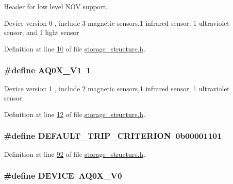 Header for low level N\+O\+V support. 

Device version 0 , include 3 magnetic sensors,1 infrared sensor, 1 ultraviolet sensor, and 1 light sensor 

Definition at line \hyperlink{a00003_source_l00010}{10} of file \hyperlink{a00003_source}{storage\+\_\+structure.\+h}.

\hypertarget{a00003_a4fe07f06b0aa99b609cb9f3d37b30932}{
\subsubsection[{A\+Q0\+X\+\_\+\+V1}]{\setlength{\rightskip}{0pt plus 5cm}\#define A\+Q0\+X\+\_\+\+V1~1}}\label{a00003_a4fe07f06b0aa99b609cb9f3d37b30932}


Device version 1 , include 2 magnetic sensors,1 infrared sensor, 1 ultraviolet sensor. 



Definition at line \hyperlink{a00003_source_l00012}{12} of file \hyperlink{a00003_source}{storage\+\_\+structure.\+h}.

\hypertarget{a00003_a0ff9495f8521ea7698e83e7b4d6a6985}{
\subsubsection[{D\+E\+F\+A\+U\+L\+T\+\_\+\+T\+R\+I\+P\+\_\+\+C\+R\+I\+T\+E\+R\+I\+O\+N}]{\setlength{\rightskip}{0pt plus 5cm}\#define D\+E\+F\+A\+U\+L\+T\+\_\+\+T\+R\+I\+P\+\_\+\+C\+R\+I\+T\+E\+R\+I\+O\+N~0b00001101}}\label{a00003_a0ff9495f8521ea7698e83e7b4d6a6985}


Definition at line \hyperlink{a00003_source_l00092}{92} of file \hyperlink{a00003_source}{storage\+\_\+structure.\+h}.

\hypertarget{a00003_a775d096fbc3988fb7ed858b79ef44e22}{
\subsubsection[{D\+E\+V\+I\+C\+E}]{\setlength{\rightskip}{0pt plus 5cm}\#define D\+E\+V\+I\+C\+E~{\bf A\+Q0\+X\+\_\+\+V0}}}\label{a00003_a775d096fbc3988fb7ed858b79ef44e22}


